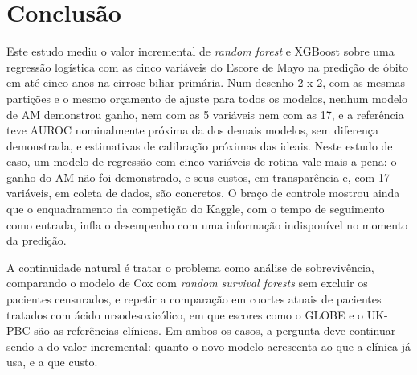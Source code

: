 \section{Conclusão}\label{sec:conclusao}

Este estudo mediu o valor incremental de \textit{random forest} e XGBoost sobre uma regressão logística com as cinco variáveis do Escore de Mayo na predição de óbito em até cinco anos na cirrose biliar primária. Num desenho 2 x 2, com as mesmas partições e o mesmo orçamento de ajuste para todos os modelos, nenhum modelo de AM demonstrou ganho, nem com as 5 variáveis nem com as 17, e a referência teve AUROC nominalmente próxima da dos demais modelos, sem diferença demonstrada, e estimativas de calibração próximas das ideais. Neste estudo de caso, um modelo de regressão com cinco variáveis de rotina vale mais a pena: o ganho do AM não foi demonstrado, e seus custos, em transparência e, com 17 variáveis, em coleta de dados, são concretos. O braço de controle mostrou ainda que o enquadramento da competição do Kaggle, com o tempo de seguimento como entrada, infla o desempenho com uma informação indisponível no momento da predição.

A continuidade natural é tratar o problema como análise de sobrevivência, comparando o modelo de Cox com \textit{random survival forests} sem excluir os pacientes censurados, e repetir a comparação em coortes atuais de pacientes tratados com ácido ursodesoxicólico, em que escores como o GLOBE e o UK-PBC são as referências clínicas. Em ambos os casos, a pergunta deve continuar sendo a do valor incremental: quanto o novo modelo acrescenta ao que a clínica já usa, e a que custo.
